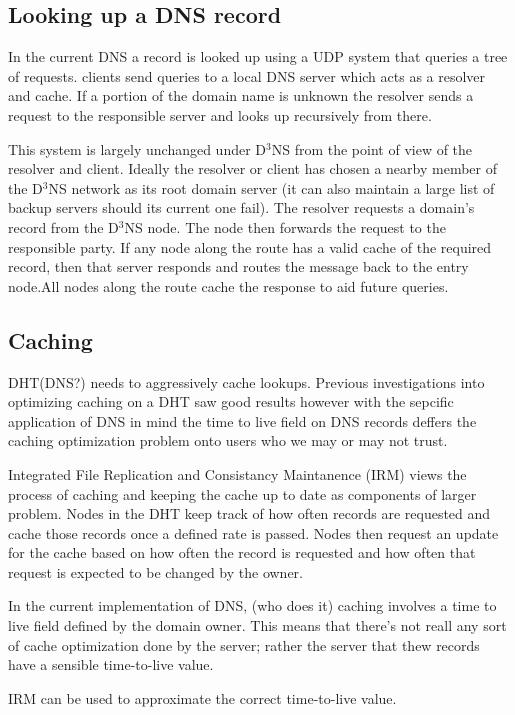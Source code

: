 \documentclass[11pt]{IEEEtran} %
\begin{document}
\subsection{Looking up a DNS record}
In the current DNS a record is looked up using a UDP system that queries a tree of requests. clients send queries to a local DNS server which acts as a resolver and cache. If a portion of the domain name is unknown the resolver sends a request to the responsible server and looks up recursively from there.

This system is largely unchanged under D$^{3}$NS from the point of view of the resolver and client. Ideally the resolver or client has chosen a nearby member of the D$^{3}$NS network as its root domain server (it can also maintain a large list of backup servers should its current one fail). The resolver requests a domain’s record from the D$^{3}$NS node. The node then forwards the request to the responsible party. If any node along the route has a valid cache of the required record, then that server responds and routes the message back to the entry node.All nodes along the route cache the response to aid future queries.

\subsection{Caching}
DHT(DNS?) needs to aggressively cache lookups. Previous investigations into optimizing caching on a DHT saw good results \cite{irm} however with the sepcific application of DNS in mind the time to live field on DNS records deffers the caching optimization problem onto users who we may or may not trust.

Integrated File Replication and Consistancy Maintanence (IRM) \cite{irm} views the process of caching and keeping the cache up to date as components of larger problem.  Nodes in the DHT keep track of how often records are requested and cache those records once a defined rate is passed.  Nodes then request an update for the cache based on how often the record is requested and how often that request is expected to be changed by the owner.


In the current implementation of DNS, (who does it) caching involves a time to live field defined by the domain owner. This means that there's not reall any sort of cache optimization done by the server; rather the server that thew records have a sensible time-to-live value.



IRM \cite{irm}  can be used to approximate the correct time-to-live value.
\end{document}

